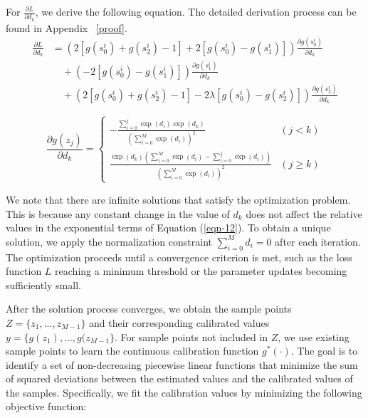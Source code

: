 \documentclass[sigconf]{acmart}
\begin{document}
For $\frac{\partial L}{\partial d_{k}}$, we derive the following equation. The detailed derivation process can be found in Appendix ~\ref{proof}.
\begin{align}\label{eqn-14} 
\frac{\partial L}{\partial d_{k}} & = \left(2\left[g\left(s_{0}^{i}\right)+g\left(s_{2}^{i}\right)-1\right]+2\left[g\left(s_{0}^{i}\right)-g\left(s_{1}^{i}\right)\right]\right) \frac{\partial g\left(s_{0}^{i}\right)}{\partial d_{k}} \nonumber \\
& \quad + \left(-2\left[g\left(s_{0}^{i}\right)-g\left(s_{1}^{i}\right)\right]\right) \frac{\partial g\left(s_{1}^{i}\right)}{\partial d_{k}}  \nonumber \\
& \quad + \left(2\left[g\left(s_{0}^{i}\right)+g\left(s_{2}^{i}\right)-1\right] - 2 \lambda\left[g\left(s_{0}^{i}\right) - g\left(s_{2}^{i}\right)\right]\right) \frac{\partial g\left(s_{2}^{i}\right)}{\partial d_{k}} 
\end{align}


\begin{equation} \label{eqn-15}
\frac{\partial g\left(z_{j}\right)}{\partial d_{k}} =
\begin{cases}
-\frac{\sum_{i=0}^{j} \exp \left(d_{i}\right) \exp \left(d_{k}\right)}{\left(\sum_{i=0}^{M} \exp \left(d_{i}\right)\right)^{2}} & (j < k) \\
\frac{\exp\left(d_{k}\right) \left( \sum_{i=0}^{M} \exp\left(d_{i}\right) - \sum_{i=0}^{j} \exp \left(d_{i}\right) \right)}{\left(\sum_{i=0}^{M} \exp\left(d_{i}\right)\right)^{2}} & (j \ge k)
\end{cases}
\end{equation}


We note that there are infinite solutions that satisfy the optimization problem.
This is because any constant change in the value of $d_k$ does not affect the relative values in the exponential terms of Equation (\ref{eqn-12}).
To obtain a unique solution, we apply the normalization constraint $\sum_{i=0}^{M}d_i = 0$ after each iteration.
The optimization proceeds until a convergence criterion is met, such as the loss function $L$ reaching a minimum threshold or the parameter updates becoming sufficiently small.


After the solution process converges, we obtain the sample points $Z = \{z_1,...,z_{M-1}\}$ and their corresponding calibrated values $y = \{g(z_1),...,g(z_{M-1}\}$. 
For sample points not included in $Z$, we use existing sample points to learn the continuous calibration function $g^*(\cdot)$.
The goal is to identify a set of non-decreasing piecewise linear functions that minimize the sum of squared deviations between the estimated values and the calibrated values of the samples.
Specifically, we fit the calibration values by minimizing the following objective function:
\end{document}
